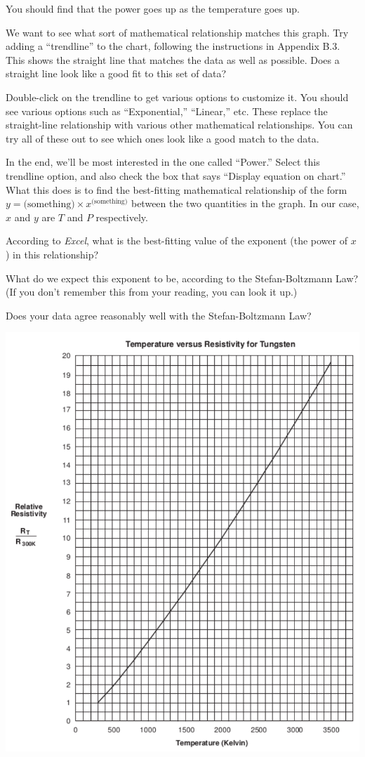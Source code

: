 You should find that the power goes up as the temperature goes up.

We want to see what sort of mathematical relationship matches this graph. 
Try adding a ``trendline'' to the chart, following the instructions
in Appendix B.3.
This shows the straight line
that matches the data as well as possible. Does a straight line look
like a good fit to this set of data?

\answerspace{1in}

Double-click on the trendline to get various options to customize it.
You should see various options such as ``Exponential,'' ``Linear,'' etc.
These replace the straight-line relationship with various other 
mathematical relationships. You can try all of these out to see
which ones look like a good match to the data.

In the end, we'll be most interested in the one called ``Power.'' Select
this trendline option, and also check the box that says ``Display
equation on chart.'' What this does is to find the best-fitting mathematical
relationship of the form $y=\mbox{(something)}\times x^{\mbox{(something)}}$
between the two quantities in the graph. In our case, $x$ and $y$
are $T$ and $P$ respectively.

According to \textit{Excel}, what is the best-fitting value
of the exponent (the power of $x$) in this relationship?

\answerspace{1in}

What do we expect this exponent to be, according to the Stefan-Boltzmann
Law? (If you don't remember this from your reading, you can look it up.)

\answerspace{1in}

Does your data agree reasonably well with the Stefan-Boltzmann Law?


\centerline{\includegraphics{stefan/stefan2.pdf}}

